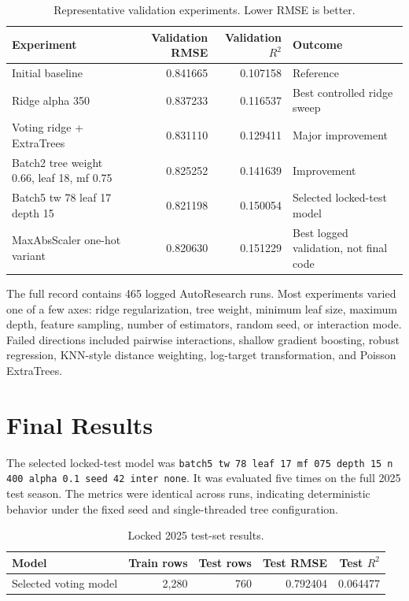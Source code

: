 \documentclass{article}
\begin{document}
\begin{table}[h]
\centering
\caption{Representative validation experiments. Lower RMSE is better.}
\begin{tabular}{lrrl}
\toprule
Experiment & Validation RMSE & Validation $R^2$ & Outcome \\
\midrule
Initial baseline & 0.841665 & 0.107158 & Reference \\
Ridge alpha 350 & 0.837233 & 0.116537 & Best controlled ridge sweep \\
Voting ridge + ExtraTrees & 0.831110 & 0.129411 & Major improvement \\
Batch2 tree weight 0.66, leaf 18, mf 0.75 & 0.825252 & 0.141639 & Improvement \\
Batch5 tw 78 leaf 17 depth 15 & 0.821198 & 0.150054 & Selected locked-test model \\
MaxAbsScaler one-hot variant & 0.820630 & 0.151229 & Best logged validation, not final code \\
\bottomrule
\end{tabular}
\end{table}

The full record contains 465 logged AutoResearch runs. Most experiments varied one of a few axes: ridge regularization, tree weight, minimum leaf size, maximum depth, feature sampling, number of estimators, random seed, or interaction mode. Failed directions included pairwise interactions, shallow gradient boosting, robust regression, KNN-style distance weighting, log-target transformation, and Poisson ExtraTrees.

\clearpage
\section{Final Results}
The selected locked-test model was \texttt{batch5 tw 78 leaf 17 mf 075 depth 15 n 400 alpha 0.1 seed 42 inter none}. It was evaluated five times on the full 2025 test season. The metrics were identical across runs, indicating deterministic behavior under the fixed seed and single-threaded tree configuration.

\begin{table}[h]
\centering
\caption{Locked 2025 test-set results.}
\begin{tabular}{lrrrr}
\toprule
Model & Train rows & Test rows & Test RMSE & Test $R^2$ \\
\midrule
Selected voting model & 2,280 & 760 & 0.792404 & 0.064477 \\
\bottomrule
\end{tabular}
\end{table}
\end{document}
